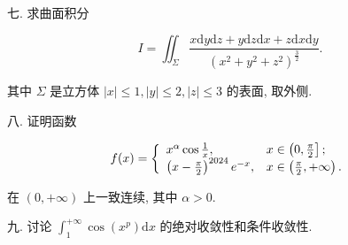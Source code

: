 \documentclass{examcollection}
\renewcommand{\displayformula}[1]{\[#1\]}
\begin{document}
{\begin{minipage}{\textwidth}
七. 求曲面积分\par
\displayformula{I = \iint_ {\Sigma} \frac {x \mathrm{d} y \mathrm{d} z + y \mathrm{d} z \mathrm{d} x + z \mathrm{d} x \mathrm{d} y}{\left(x ^ {2} + y ^ {2} + z ^ {2}\right) ^ {\frac {3}{2}}}.}\par
其中  $\Sigma$  是立方体  $|x| \leq 1, |y| \leq 2, |z| \leq 3$  的表面, 取外侧.\par
八. 证明函数\par
\displayformula{f (x) = \left\{ \begin{array}{l l} x ^ {\alpha} \cos \frac {1}{x}, & x \in \left(0, \frac {\pi}{2} \right]; \\ \left(x - \frac {\pi}{2}\right) ^ {2024} e ^ {- x}, & x \in \left(\frac {\pi}{2}, + \infty\right). \end{array} \right.}\par
在 $(0, +\infty)$ 上一致连续, 其中 $\alpha > 0$.\par
九. 讨论 $\int_{1}^{+\infty}\cos (x^{p})\mathrm{d}x$ 的绝对收敛性和条件收敛性.\par
\end{minipage}}
\ifdim\dimexpr\ht\proofbox+\dp\proofbox\relax>\textheight
\noindent\resizebox{!}{\textheight}{\usebox{\proofbox}}\else\noindent\usebox{\proofbox}\fi\clearpage
\end{document}
